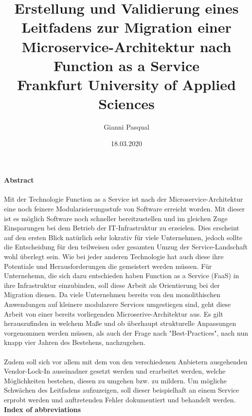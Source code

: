 \documentclass[11pt]{article}
\title{
{Erstellung und Validierung eines Leitfadens zur Migration einer Microservice-Architektur nach Function as a Service}\\
{\large Frankfurt University of Applied Sciences}\\}
\author{Gianni Pasqual}
\date{18.03.2020}
\begin{document}
\maketitle
\newpage
{\Large \textbf {Abstract}}
\\\\
Mit der Technologie Function as a Service ist nach der Microservice-Architektur eine noch feinere Modularisierungsstufe von Software erreicht worden. Mit dieser ist es möglich Software noch schneller bereitzustellen und im gleichen Zuge Einsparungen bei dem Betrieb der IT-Infrastruktur zu erzeielen. Dies erscheint auf den ersten Blick natürlich sehr lokrativ für viele Unternehmen, jedoch sollte die Entscheidung für den teilweisen oder gesamten Umzug der Service-Landschaft wohl überlegt sein. Wie bei jeder anderen Technologie hat auch diese ihre Potentiale und Herausforderungen die gemeistert werden müssen. Für Unternehemn, die sich dazu entschieden haben Function as a Service (FaaS) in ihre Infrastruktur einzubinden, soll diese Arbeit als Orientierung bei der Migration dienen. Da viele Unternehmen bereits von den monolithischen Anwendungen auf kleinere modularere Services umgestiegen sind, geht diese Arbeit von einer bereits vorliegenden Microserive-Architektur aus. Es gilt herauszufinden in welchem Maße und ob überhaupt strukturelle Anpassungen vorgenommen werden müssen, als auch der Frage nach "Best-Practices", nach nun knapp vier Jahren des Bestehens, nachzugehen.
\\\\
Zudem soll sich vor allem mit dem von den verschiedenen Anbietern ausgehenden Vendor-Lock-In auseinadner gesetzt werden und erarbeitet werden, welche Möglichkeiten bestehen, diesen zu umgehen bzw. zu mildern. Um mögliche Schwächen des Leitfadens aufzuzeigen, soll dieser beispielhaft an einem Service erprobt werden und auftretenden Fehler dokumentiert und behandelt werden.
\newpage
{\Large \textbf {Index of abbreviations}}
\\\\\\
\end{document}
